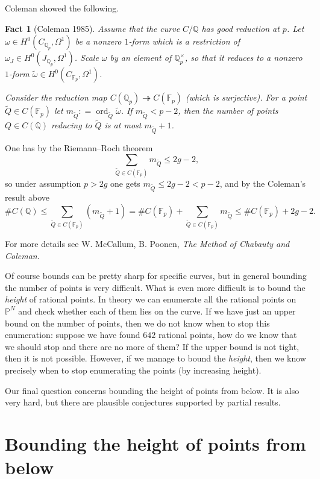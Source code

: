 \documentclass{article}
\newtheorem{fact}[proposition]{Fact}
\theoremstyle{definition}
\DeclareMathOperator{\ord}{ord}
\newcommand{\dfn}{\mathrel{\mathop:}=}
\newcommand{\FF}{\mathbb{F}}
\newcommand{\QQ}{\mathbb{Q}}
\newcommand{\PP}{\mathbb{P}}
\begin{document}
Coleman showed the following.

\begin{fact}[Coleman 1985]
  Assume that the curve $C/\QQ$ has good reduction at $p$. Let
  $\omega \in H^0 (C_{\QQ_p}, \Omega^1)$ be a nonzero $1$-form which is a
  restriction of $\omega_J \in H^0 (J_{\QQ_p}, \Omega^1)$. Scale $\omega$ by an
  element of $\QQ_p^\times$, so that it reduces to a nonzero $1$-form
  $\widetilde{\omega} \in H^0 (C_{\FF_p}, \Omega^1)$.

  Consider the reduction map $C (\QQ_p) \twoheadrightarrow C (\FF_p)$ (which is
  surjective). For a point $\widetilde{Q} \in C (\FF_p)$ let
  $m_{\widetilde{Q}} \dfn \ord_{\widetilde{Q}} \widetilde{\omega}$.
  If $m_{\widetilde{Q}} < p - 2$, then the number of points $Q \in C (\QQ)$
  reducing to $\widetilde{Q}$ is at most $m_{\widetilde{Q}}+1$.
\end{fact}

One has by the Riemann--Roch theorem
$$\sum_{\widetilde{Q} \in C (\FF_p)} m_{\widetilde{Q}} \le 2g-2,$$
so under assumption $p > 2g$ one gets $m_{\widetilde{Q}} \le 2g-2 < p-2$, and by
the Coleman's result above
\[ \# C (\QQ) \le \sum_{\widetilde{Q} \in C (\FF_p)} (m_{\widetilde{Q}} + 1) =
  \# C (\FF_p) + \sum_{\widetilde{Q} \in C (\FF_p)} m_{\widetilde{Q}} \le
  \# C (\FF_p) + 2g - 2. \]

For more details see W. McCallum, B. Poonen,
\emph{The Method of Chabauty and Coleman}.

\vspace{1em}

Of course bounds can be pretty sharp for specific curves, but in general
bounding the number of points is very difficult. What is even more difficult is
to bound the \emph{height} of rational points. In theory we can enumerate all
the rational points on $\PP^N$ and check whether each of them lies on the
curve. If we have just an upper bound on the number of points, then we do not
know when to stop this enumeration: suppose we have found $642$ rational points,
how do we know that we should stop and there are no more of them? If the upper
bound is not tight, then it is not possible. However, if we manage to bound the
\emph{height}, then we know precisely when to stop enumerating the points
(by increasing height).

Our final question concerns bounding the height of points from below. It is also
very hard, but there are plausible conjectures supported by partial results.

\section{Bounding the height of points from below}
\end{document}
